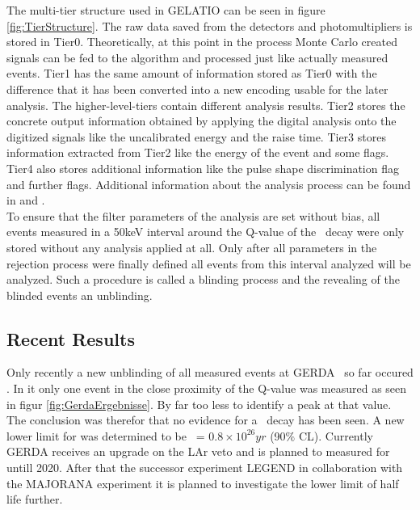 \documentclass[encoding=utf8,british]{tumphthesis}
\begin{document}
The multi-tier structure used in GELATIO can be seen in figure \ref{fig:TierStructure}.
The raw data saved from the detectors and photomultipliers is stored in Tier0.
Theoretically, at this point in the process Monte Carlo created signals can be fed to the algorithm and processed just like actually measured events.
Tier1 has the same amount of information stored as Tier0 with the difference that it has been converted into a new encoding usable for the later analysis.
The higher-level-tiers contain different analysis results.
Tier2 stores the concrete output information obtained by applying the digital analysis onto the digitized signals like the uncalibrated energy and the raise time.
Tier3 stores information extracted from Tier2 like the energy of the event and some flags.
Tier4 also stores additional information like the pulse shape discrimination flag and further flags.
Additional information about the analysis process can be found in \cite{agostini_gelatio:_2011} and \cite{agostini_off-line_2011}.
\\

To ensure that the filter parameters of the analysis are set without bias, all events measured in a  50keV interval around the Q-value of the \twonu\ decay were only stored without any analysis applied at all.
Only after all parameters in the rejection process were finally defined all events from this interval analyzed will be analyzed. 
Such a procedure is called a blinding process and the revealing of the blinded events an unblinding. 
\\

\subsection{Recent Results}
\label{sec:ResultsofGERDA}

Only recently a new unblinding of all measured events at GERDA \PII\ so far  occured \cite{zsigmond_new_2018}.
In it only one event in the close proximity of the Q-value was measured as seen in figur \ref{fig:GerdaErgebnisse}.
By far too less to identify a peak at that value.
The conclusion was therefor that no evidence for a \onbb\ decay has been seen.
A new lower limit for  was determined to be \thalfzero\ = $0.8\times10^{26}\unit{yr}$ (90$\%$ CL).
Currently GERDA receives an upgrade on the LAr veto and is planned to measured for untill 2020.
After that the successor experiment LEGEND in collaboration with the MAJORANA experiment it is planned to investigate the lower limit of  half life further.
\end{document}
